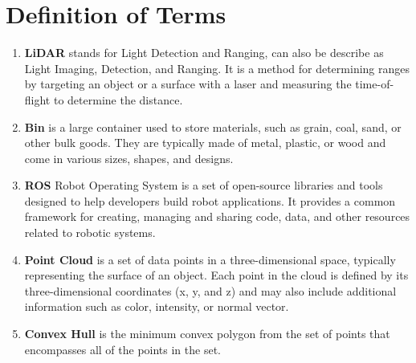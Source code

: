 \section{Definition of Terms}
\label{intro:sec:Definition of Terms}

\begin{enumerate}
	\item \textbf{LiDAR} \textemdash stands for Light Detection and Ranging, can also be describe as Light Imaging, Detection, and Ranging. It is a method for determining ranges by targeting an object or a surface with a laser and measuring the time-of-flight to determine the distance.

	\item \textbf{Bin} \textemdash is a large container used to store materials, such as grain, coal, sand, or other bulk goods. They are typically made of metal, plastic, or wood and come in various sizes, shapes, and designs.

	\item \textbf{ROS} \textemdash Robot Operating System is a set of open-source libraries and tools designed to help developers build robot applications. It provides a common framework for creating, managing and sharing code, data, and other resources related to robotic systems.

	\item \textbf{Point Cloud} \textemdash is a set of data points in a three-dimensional space, typically representing the surface of an object. Each point in the cloud is defined by its three-dimensional coordinates (x, y, and z) and may also include additional information such as color, intensity, or normal vector.
	\item \textbf{Convex Hull} \textemdash is the minimum convex polygon from the set of points that encompasses all of the points in the set.

\end{enumerate}